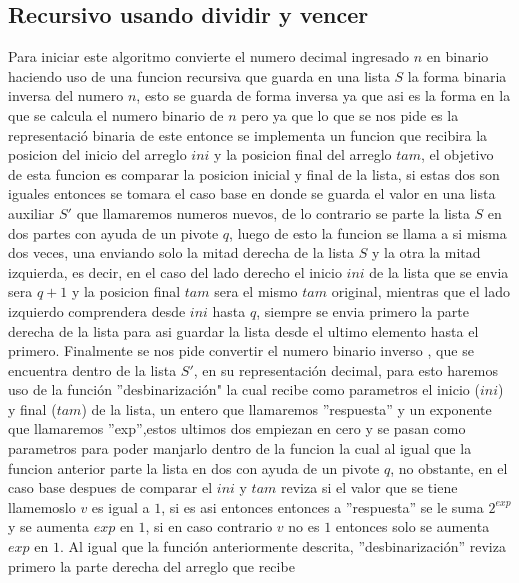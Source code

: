 \documentclass[letter]{article}
\begin{document}
\subsection{Recursivo usando dividir y vencer} \label{algoritmos:recursivo}
Para iniciar este algoritmo convierte el numero decimal ingresado $n$ en binario haciendo uso de una funcion recursiva que guarda en una lista $S$ la forma binaria inversa del numero $n$, esto se guarda de forma inversa ya que asi es la forma en la que se calcula el numero binario de $n$ pero ya que lo que se nos pide es la representació binaria de este entonce se implementa un funcion que recibira la posicion del inicio del arreglo $ini$ y la posicion final del arreglo $tam$, el objetivo de esta funcion es comparar la posicion inicial y final de la lista, si estas dos son iguales entonces se tomara el caso base en donde se guarda el valor en una lista auxiliar $S'$ que llamaremos numeros nuevos, de lo contrario se parte la lista $S$ en dos partes con ayuda de un pivote $q$, luego de esto la funcion se llama a si misma dos veces, una enviando solo la mitad derecha de la lista $S$ y la otra la mitad izquierda, es decir, en el caso del lado derecho el inicio $ini$ de la lista que se envia sera $q+1$ y la posicion final $tam$ sera el mismo $tam$ original, mientras que el lado izquierdo comprendera desde $ini$ hasta $q$, siempre se envia primero la parte derecha de la lista para asi guardar la lista desde el ultimo elemento hasta el primero.
Finalmente se nos pide convertir el numero binario inverso , que se encuentra dentro de la lista $S'$, en su representación decimal, para esto haremos uso de la función ''desbinarización" la cual recibe como parametros el inicio ($ini$) y final ($tam$) de la lista, un entero que llamaremos ''respuesta'' y un exponente que llamaremos ''exp'',estos ultimos dos empiezan en cero y se pasan como parametros para poder manjarlo dentro de la funcion la cual al igual que la funcion anterior parte la lista en dos con ayuda de un pivote $q$, no obstante, en el caso base despues de comparar el $ini$ y $tam$ reviza si el valor que se tiene llamemoslo $v$ es igual a $1$, si es asi entonces entonces a ''respuesta'' se le suma  $2^{exp}$ y se aumenta $exp$ en $1$, si en caso contrario $v$ no es $1$ entonces solo se aumenta $exp$ en $1$. Al igual que la función anteriormente descrita, ''desbinarización'' reviza primero la parte derecha del arreglo que recibe 
\end{document}
